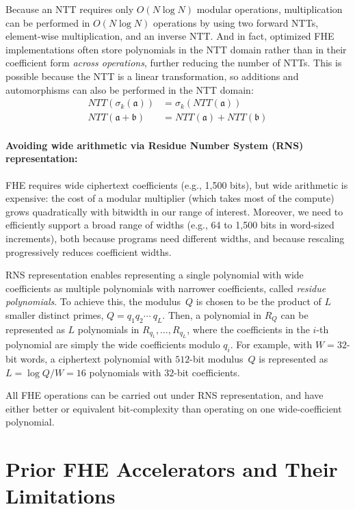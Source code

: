 Because an NTT requires only $O(N \log N)$ modular operations, multiplication
can be performed in $O(N \log N)$ operations by using two forward NTTs,
element-wise multiplication, and an inverse NTT. And in fact, optimized FHE
implementations often store polynomials in the NTT domain rather than in their
coefficient form \emph{across operations}, further reducing the number of NTTs.
This is possible because the NTT is a linear transformation, so additions and
automorphisms can also be performed in the NTT domain:
\begin{align*}
    NTT(\sigma_k(\mathfrak{a})) &= \sigma_k(NTT(\mathfrak{a})) \\
    NTT(\mathfrak{a} + \mathfrak{b}) &= NTT(\mathfrak{a}) + NTT(\mathfrak{b})
\end{align*}

\paragraph{Avoiding wide arithmetic via Residue Number System (RNS) representation:}
FHE requires wide ciphertext coefficients (e.g., 1,500 bits), but wide
arithmetic is expensive: the cost of a modular multiplier (which takes most of
the compute) grows quadratically with bitwidth in our range of interest.
Moreover, we need to efficiently support a broad range of widths (e.g., 64 to
1,500 bits in word-sized increments), both because programs need different
widths, and because rescaling progressively reduces coefficient widths.

RNS representation \cite{garner:1959:residue} enables representing a single
polynomial with wide coefficients as multiple polynomials with narrower
coefficients, called \emph{residue polynomials}. To achieve this, the
modulus~$Q$  is chosen to be the product of $L$ smaller distinct primes, $Q =
q_1q_2\cdots\ q_L$. Then, a polynomial in $R_Q$ can be represented as $L$
polynomials in $R_{q_1}, \ldots, R_{q_L}$, where the coefficients in the $i$-th
polynomial are simply the wide coefficients modulo $q_i$. For example, with $W
= 32$-bit words, a ciphertext polynomial with $512$-bit modulus~$Q$ is
represented as $L = \log Q/W = 16$ polynomials with $32$-bit coefficients.

All FHE operations can be carried out under RNS representation, and have either
better or equivalent bit-complexity than operating on one wide-coefficient
polynomial.

\section{Prior FHE Accelerators and Their Limitations}\label{sec:drawbacks}


